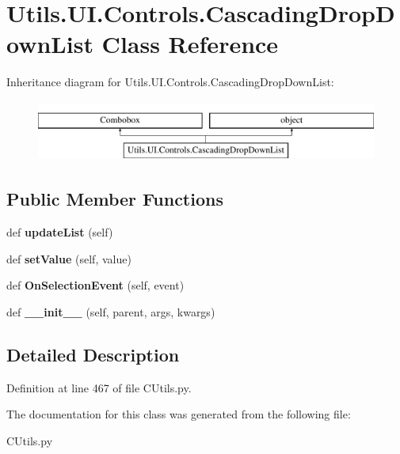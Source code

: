 \hypertarget{class_c_utils_1_1_utils_1_1_u_i_1_1_controls_1_1_cascading_drop_down_list}{}\section{Utils.\+U\+I.\+Controls.\+Cascading\+Drop\+Down\+List Class Reference}
\label{class_c_utils_1_1_utils_1_1_u_i_1_1_controls_1_1_cascading_drop_down_list}
Inheritance diagram for Utils.\+U\+I.\+Controls.\+Cascading\+Drop\+Down\+List\+:\begin{figure}[H]
\begin{center}
\leavevmode
\includegraphics[height=2.000000cm]{class_c_utils_1_1_utils_1_1_u_i_1_1_controls_1_1_cascading_drop_down_list}
\end{center}
\end{figure}
\subsection*{Public Member Functions}
\begin{DoxyCompactItemize}
\item 
\mbox{\label{class_c_utils_1_1_utils_1_1_u_i_1_1_controls_1_1_cascading_drop_down_list_a90eb243f26a86bc38d244f3739903784}} 
def {\bfseries update\+List} (self)
\item 
\mbox{\label{class_c_utils_1_1_utils_1_1_u_i_1_1_controls_1_1_cascading_drop_down_list_acbb5ee6f0b020063313ad70ad4b6e38f}} 
def {\bfseries set\+Value} (self, value)
\item 
\mbox{\label{class_c_utils_1_1_utils_1_1_u_i_1_1_controls_1_1_cascading_drop_down_list_a6461a5bc77ce2c6d5c6b25fc3abaccc1}} 
def {\bfseries On\+Selection\+Event} (self, event)
\item 
\mbox{\label{class_c_utils_1_1_utils_1_1_u_i_1_1_controls_1_1_cascading_drop_down_list_a2d9f1b9bed847ff75b9f232ced637286}} 
def {\bfseries \+\_\+\+\_\+init\+\_\+\+\_\+} (self, parent, args, kwargs)
\end{DoxyCompactItemize}


\subsection{Detailed Description}


Definition at line 467 of file C\+Utils.\+py.



The documentation for this class was generated from the following file\+:\begin{DoxyCompactItemize}
\item 
C\+Utils.\+py\end{DoxyCompactItemize}
